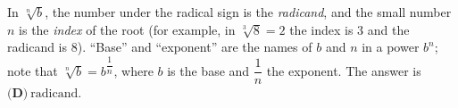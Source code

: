 In $\sqrt[n]{b}$, the number under the radical sign is the \emph{radicand}, and the small number $n$ is the \emph{index} of the root (for example, in $\sqrt[3]{8}=2$ the index is $3$ and the radicand is $8$). ``Base'' and ``exponent'' are the names of $b$ and $n$ in a power $b^n$; note that $\sqrt[n]{b}=b^{\dfrac1n}$, where $b$ is the base and $\dfrac1n$ the exponent. The answer is $\boxed{\textbf{(D)}\ \text{radicand}}$.
